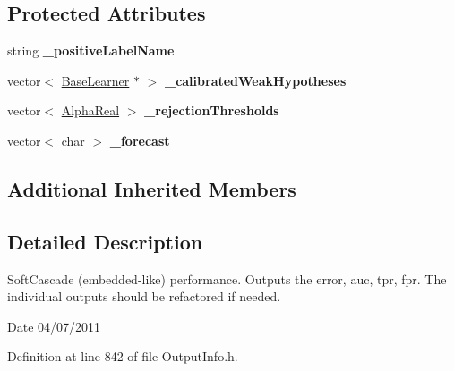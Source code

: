 \subsection*{Protected Attributes}
\begin{DoxyCompactItemize}
\item 
\hypertarget{classMultiBoost_1_1SoftCascadeOutput_a3cc2f6b99f310a99ad289fe1e9dcb82f}{string {\bfseries \-\_\-positive\-Label\-Name}}\label{classMultiBoost_1_1SoftCascadeOutput_a3cc2f6b99f310a99ad289fe1e9dcb82f}

\item 
\hypertarget{classMultiBoost_1_1SoftCascadeOutput_a9ee41c93f1c95dc2cac0479e601de718}{vector$<$ \hyperlink{classMultiBoost_1_1BaseLearner}{Base\-Learner} $\ast$ $>$ {\bfseries \-\_\-calibrated\-Weak\-Hypotheses}}\label{classMultiBoost_1_1SoftCascadeOutput_a9ee41c93f1c95dc2cac0479e601de718}

\item 
\hypertarget{classMultiBoost_1_1SoftCascadeOutput_ab0f05d76faf177db543db65b06f4b2f9}{vector$<$ \hyperlink{Defaults_8h_a80184c4fd10ab70a1a17c5f97dcd1563}{Alpha\-Real} $>$ {\bfseries \-\_\-rejection\-Thresholds}}\label{classMultiBoost_1_1SoftCascadeOutput_ab0f05d76faf177db543db65b06f4b2f9}

\item 
\hypertarget{classMultiBoost_1_1SoftCascadeOutput_ad0a6c018b2602bbc1766d1632248390b}{vector$<$ char $>$ {\bfseries \-\_\-forecast}}\label{classMultiBoost_1_1SoftCascadeOutput_ad0a6c018b2602bbc1766d1632248390b}

\end{DoxyCompactItemize}
\subsection*{Additional Inherited Members}


\subsection{Detailed Description}
Soft\-Cascade (embedded-\/like) performance. Outputs the error, auc, tpr, fpr. The individual outputs should be refactored if needed. \begin{DoxyDate}{Date}
04/07/2011 
\end{DoxyDate}


Definition at line 842 of file Output\-Info.\-h.



